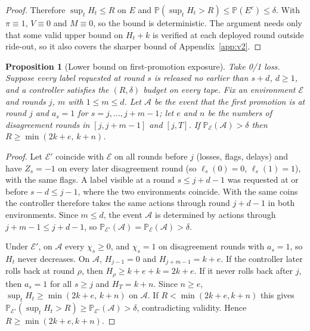 \documentclass[10pt]{article}
\theoremstyle{plain}
\newtheorem{proposition}{Proposition}
\theoremstyle{definition}
\newcommand{\PP}{\mathbb{P}}
\begin{document}
\begin{proof}
Therefore $\sup_tH_t\le R$ on $E$ and $\PP(\sup_tH_t>R)\le\PP(E^c)\le\delta$. With $\pi\equiv1$, $V\equiv0$ and $M\equiv0$, so the bound is deterministic. The argument needs only that some valid upper bound on $H_t+k$ is verified at each deployed round outside ride-out, so it also covers the sharper bound of Appendix~\ref{app:v2}.
\end{proof}

\begin{samepage}
\begin{proposition}[Lower bound on first-promotion exposure]\label{prop:reserves}
Take 0/1 loss. Suppose every label requested at round $s$ is released no earlier than $s+d$, $d\ge1$, and a controller satisfies the $(R,\delta)$ budget on every tape. Fix an environment $\mathcal E$ and rounds $j$, $m$ with $1\le m\le d$. Let $\mathcal A$ be the event that the first promotion is at round $j$ and $a_s=1$ for $s=j,\dots,j+m-1$; let $e$ and $n$ be the numbers of disagreement rounds in $[j,j+m-1]$ and $[j,T]$. If $\PP_{\mathcal E}(\mathcal A)>\delta$ then $R\ge\min(2k+e,\,k+n)$.
\end{proposition}
\end{samepage}
\begin{proof}
Let $\mathcal E'$ coincide with $\mathcal E$ on all rounds before $j$ (losses, flags, delays) and have $Z_s=-1$ on every later disagreement round (so $\ell_s(0)=0$, $\ell_s(1)=1$), with the same flags. A label visible at a round $s\le j+d-1$ was requested at or before $s-d\le j-1$, where the two environments coincide. With the same coins the controller therefore takes the same actions through round $j+d-1$ in both environments. Since $m\le d$, the event $\mathcal A$ is determined by actions through $j+m-1\le j+d-1$, so $\PP_{\mathcal E'}(\mathcal A)=\PP_{\mathcal E}(\mathcal A)>\delta$.

Under $\mathcal E'$, on $\mathcal A$ every $\chi_s\ge0$, and $\chi_s=1$ on disagreement rounds with $a_s=1$, so $H_t$ never decreases. On $\mathcal A$, $H_{j-1}=0$ and $H_{j+m-1}=k+e$. If the controller later rolls back at round $\rho$, then $H_\rho\ge k+e+k=2k+e$. If it never rolls back after $j$, then $a_s=1$ for all $s\ge j$ and $H_T=k+n$. Since $n\ge e$, $\sup_tH_t\ge\min(2k+e,\,k+n)$ on $\mathcal A$. If $R<\min(2k+e,k+n)$ this gives $\PP_{\mathcal E'}(\sup_tH_t>R)\ge\PP_{\mathcal E'}(\mathcal A)>\delta$, contradicting validity. Hence $R\ge\min(2k+e,k+n)$.
\end{proof}
\end{document}
